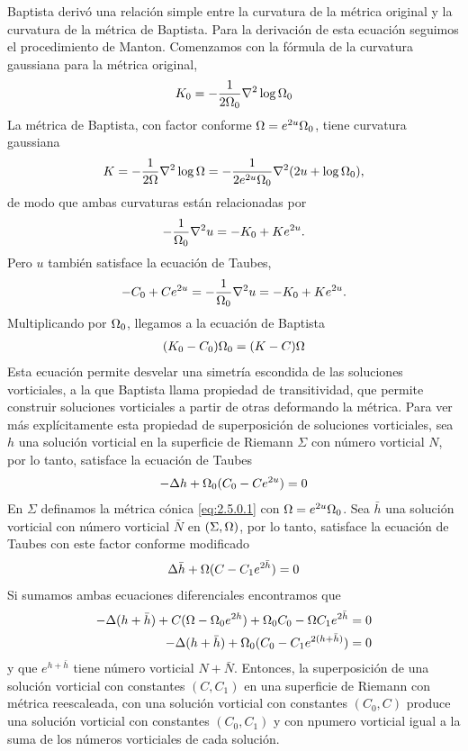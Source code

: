 Baptista derivó una relación simple entre la curvatura de la métrica original y la curvatura de la métrica de Baptista. Para la derivación de esta ecuación seguimos el procedimiento de Manton. Comenzamos con la fórmula de la curvatura gaussiana para la métrica original,
\begin{align}
    K_0 = -\frac{1}{2\Omega_0}\nabla^2\log\Omega_0\label{2.5.0.2}
\end{align}
La métrica de Baptista, con factor conforme $\Omega=e^{2u}\Omega_0$, tiene curvatura gaussiana
\begin{align*}
    K = -\frac{1}{2\Omega}\nabla^2\log\Omega = -\frac{1}{2e^{2u}\Omega_0}\nabla^2(2u+\log\Omega_0),
\end{align*}
de modo que ambas curvaturas están relacionadas por 
\begin{align*}
    -\frac{1}{\Omega_0}\nabla^2u=-K_0+Ke^{2u}.
\end{align*}
Pero $u$ también satisface la ecuación de Taubes,
\begin{align*}
    -C_0+Ce^{2u}=-\frac{1}{\Omega_0}\nabla^2u=-K_0+Ke^{2u}.
\end{align*}
Multiplicando por $\Omega_0$, llegamos a la ecuación de Baptista
\begin{align}
    (K_0-C_0)\Omega_0=(K-C)\Omega\label{eq:2.5.0.3}
\end{align}
Esta ecuación permite desvelar una simetría escondida de las soluciones vorticiales, a la que Baptista llama propiedad de transitividad, que permite construir soluciones vorticiales a partir de otras deformando la métrica. Para ver más explícitamente esta propiedad de superposición de soluciones vorticiales, sea $h$ una solución vorticial en la superficie de Riemann $\Sigma$ con número vorticial $N$, por lo tanto, satisface la ecuación de Taubes
\begin{align*}
    -\Delta h+\Omega_0(C_0-Ce^{2u}) =0
\end{align*}
En $\Sigma$ definamos la métrica cónica \eqref{eq:2.5.0.1} con $\Omega=e^{2u}\Omega_0$. Sea $\bar h$ una solución vorticial con número vorticial $\bar N$ en $(\Sigma,\Omega)$, por lo tanto, satisface la ecuación de Taubes con este factor conforme modificado
\begin{align*}
    \Delta\bar h+\Omega(C-C_1e^{2\bar h}) =0
\end{align*}
Si sumamos ambas ecuaciones diferenciales encontramos que
\begin{align*}
    -\Delta(h+\bar h)+C(\Omega-\Omega_0 e^{2h})+\Omega_0 C_0-\Omega C_1 e^{2\bar h} &= 0\\
    -\Delta(h+\bar h)+\Omega_0(C_0-C_1 e^{2(h+\bar h)}) &= 0
\end{align*}
 y que $e^{h+\bar h}$ tiene número vorticial $N+\bar N$. Entonces, la superposición de una solución vorticial con constantes $(C,C_1)$ en una superficie de Riemann con métrica reescaleada, con una solución vorticial con constantes $(C_0,C)$ produce una solución vorticial con constantes $(C_0,C_1)$ y con npumero vorticial igual a la suma de los números vorticiales de cada solución.
 
